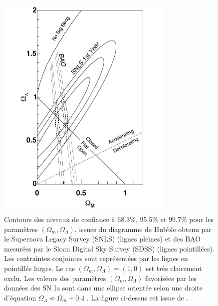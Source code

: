 \documentclass[a4paper,12pt]{report}
\theoremstyle{plain}
\theoremstyle{plain}
\begin{document}
% 
% 
  \begin{figure}[h]
 \includegraphics[width=20pc]{figgene2.png}
 \caption{\label{figgene2} Contours des niveaux de confiance \`a $ 68.3 \% $, $ 95.5 \% $ et $ 99.7 \% $ pour les param\`etres
 $ (\Omega_m, \Omega_\Lambda )$, issues du diagramme de Hubble obtenu par le Supernova Legacy Survey (SNLS)
 (lignes pleines) et des BAO mesur\'ees par le Sloan Digital Sky Survey (SDSS) (lignes 
 pointill\'ees). Les contraintes conjointes sont repr\'esent\'ees par les lignes en pointill\'es larges. Le
 cas $ (\Omega_m, \Omega_\Lambda ) = (1, 0)$ est tr\`es clairement exclu. Les valeurs des param\`etres $ (\Omega_m, \Omega_\Lambda )$ 
 favoris\'ees par les donn\'ees des SN Ia sont dans une ellipse orient\'ee selon une droite d'\'equation
   $  \Omega_\Lambda \backsimeq  \Omega_m + 0.4 $ . La figure ci-dessus est issue de \cite{26}.
   }
 \end{figure}
\end{document}
